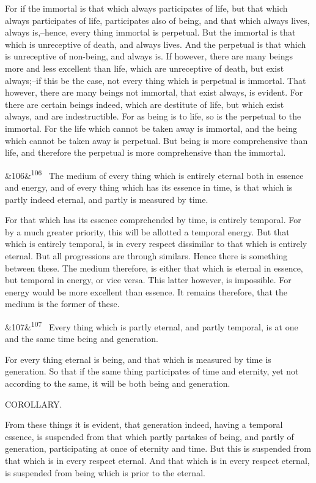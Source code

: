 \documentclass[12pt]{article}
\newcommand{\para}[1][]{\par\noindent\ifx&#1&\else\textsuperscript{\footnotesize #1}~\fi}
\begin{document}
For if the immortal is that which always participates of life, but that which always participates of life, participates also of being, and that which always lives, always is,--hence, every thing immortal is perpetual. But the immortal is that which is unreceptive of death, and always lives. And the perpetual is that which is unreceptive of non-being, and always is. If however, there are many beings more and less excellent than life, which are unreceptive of death, but exist always;--if this be the case, not every thing which is perpetual is immortal. That however, there are many beings not immortal, that exist always, is evident. For there are certain beings indeed, which are destitute of life, but which exist always, and are indestructible. For as being is to life, so is the perpetual to the immortal. For the life which cannot be taken away is immortal, and the being which cannot be taken away is perpetual. But being is more comprehensive than life, and therefore the perpetual is more comprehensive than the immortal.

\para[106] The medium of every thing which is entirely eternal both in essence and energy, and of every thing which has its essence in time, is that which is partly indeed eternal, and partly is measured by time.

For that which has its essence comprehended by time, is entirely temporal. For by a much greater priority, this will be allotted a temporal energy. But that which is entirely temporal, is in every respect dissimilar to that which is entirely eternal. But all progressions are through similars. Hence there is something between these. The medium therefore, is either that which is eternal in essence, but temporal in energy, or vice versa. This latter however, is impossible. For energy would be more excellent than essence. It remains therefore, that the medium is the former of these.

\para[107] Every thing which is partly eternal, and partly temporal, is at one and the same time being and generation.

For every thing eternal is being, and that which is measured by time is generation. So that if the same thing participates of time and eternity, yet not according to the same, it will be both being and generation.

COROLLARY.

From these things it is evident, that generation indeed, having a temporal essence, is suspended from that which partly partakes of being, and partly of generation, participating at once of eternity and time. But this is suspended from that which is in every respect eternal. And that which is in every respect eternal, is suspended from being which is prior to the eternal.
\end{document}
